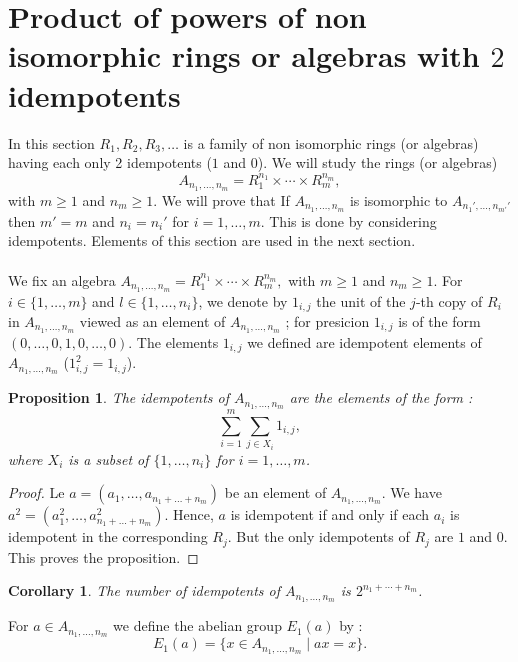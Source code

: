 \documentclass[12pt, reqno]{amsart}
\newtheorem{proposition}[theorem]{Proposition}
\newtheorem{corollary}[theorem]{Corollary}
\begin{document}
\section{Product of powers of non isomorphic rings or algebras with $2$ idempotents}\label{s1}
In this section $R_1,R_2,R_3,\dots$ is a family of non isomorphic rings (or algebras) having each only 2 idempotents ($1$ and $0$). We will study the rings (or algebras) $$A_{n_1,\dots,n_m}=R_1^{n_1}\times\cdots \times R_m^{n_m},$$ with $m\geq 1$ and $n_m \geq 1$.
 We will prove that If $A_{n_1,\dots,n_m}$ is isomorphic to $A_{n_1',\dots,n_{m'}'}$ then $m'=m$ and $n_i=n_i'$ for $i=1,\dots,m$. This is done by considering idempotents. Elements of this section are used in the next section.\\\\
 We fix an algebra $A_{n_1,\dots,n_m}=R_1^{n_1}\times \cdots \times R_m^{n_m},$ with $m\geq 1$ and $n_m \geq 1$.
 For $i\in \{1,\dots,m\}$ and $l\in\{1,\dots,n_i\}$, we denote by $1_{i,j}$ the unit of the $j$-th copy of $R_i $ in $A_{n_1,\dots,n_m}$ viewed as an element of $A_{n_1,\dots,n_m}$ ; for presicion $1_{i,j}$ is of the form $ (0,\dots,0,1,0,\dots,0)$. The elements $1_{i,j}$ we defined are idempotent elements of $A_{n_1,\dots,n_m}$ ($1_{i,j}^2=1_{i,j}$).

\begin{proposition}\label{decomp}
The idempotents of $A_{n_1,\dots,n_m}$ are the elements of the form : 
$$\overset{m}{\underset{i=1}{\sum}} \underset{j\in X_i}{\sum} 1_{i,j}, $$
where $X_i$ is a subset of $\{1,\dots,n_i\}$ for $i=1,\dots,m$.
\end{proposition}
\begin{proof}
Le $a=(a_1,\dots , a_{n_1+\dots+n_m})$ be an element of $A_{n_1,\dots,n_m}$. We have $a^2=(a_1^2,\dots , a_{n_1+\dots+n_m}^2)$. Hence, $a$ is idempotent if and only if each $a_i$ is idempotent in the corresponding $R_j$. But the only idempotents of $R_j$ are $1$ and $0$. This proves the proposition.
\end{proof}

\begin{corollary}\label{num idem}
The number of idempotents of $ A_{n_1,\dots,n_m}$ is $2^{n_1+\cdots+n_m}$.
\end{corollary}

For $a\in A_{n_1,\dots,n_m}$ we define the abelian group $E_1(a)$ by : $$E_1(a)=\{x \in A_{n_1,\dots,n_m}\mid ax=x \}.$$
\end{document}
